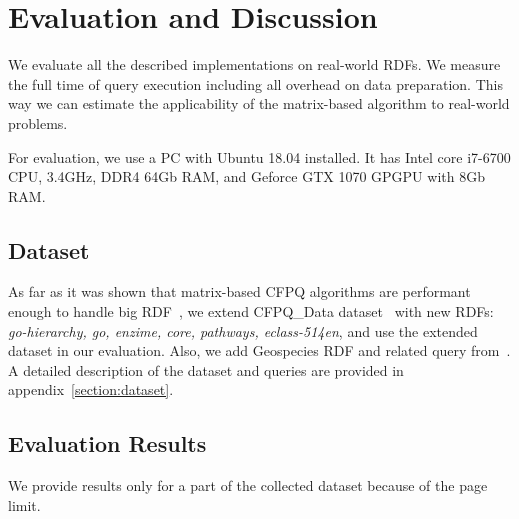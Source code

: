 \section{Evaluation and Discussion}

We evaluate all the described implementations on real-world RDFs.
We measure the full time of query execution including all overhead on data preparation.
This way we can estimate the applicability of the matrix-based algorithm to real-world problems.

For evaluation, we use a PC with Ubuntu 18.04 installed.
It has Intel core i7-6700 CPU, 3.4GHz, DDR4 64Gb RAM, and Geforce GTX 1070 GPGPU with 8Gb RAM.

\subsection{Dataset}
As far as it was shown that matrix-based CFPQ algorithms are performant enough to handle big RDF~\cite{Mishin:2019:ECP:3327964.3328503}, we extend CFPQ\_Data dataset~\cite{Mishin:2019:ECP:3327964.3328503} with new RDFs: \textit{go-hierarchy, go, enzime, core, pathways, eclass-514en}, and use the extended dataset in our evaluation. Also, we add Geospecies RDF and related query from~\cite{Kuijpers:2019:ESC:3335783.3335791}. 
A detailed description of the dataset and queries are provided in appendix~\ref{section:dataset}.


\subsection{Evaluation Results}
We provide results only for a part of the collected dataset because of the page limit.

